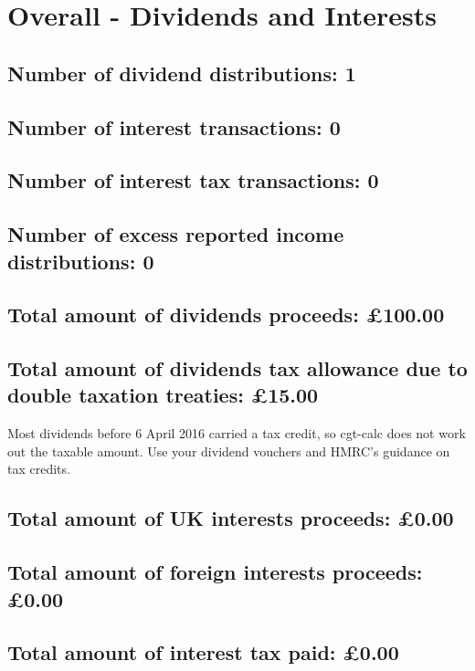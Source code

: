 \documentclass{article}
\begin{document}
\section*{Overall - Dividends and Interests}
\subsection*{Number of dividend distributions: 1}
\subsection*{Number of interest transactions: 0}
\subsection*{Number of interest tax transactions: 0}
\subsection*{Number of excess reported income distributions: 0}
\subsection*{Total amount of dividends proceeds: £100.00}
\subsection*{Total amount of dividends tax allowance due to double taxation treaties: £15.00}
Most dividends before 6 April 2016 carried a tax credit, so cgt-calc does not work out the taxable amount. Use your dividend vouchers and HMRC's guidance on tax credits.
\subsection*{Total amount of UK interests proceeds: £0.00}
\subsection*{Total amount of foreign interests proceeds: £0.00}
\subsection*{Total amount of interest tax paid: £0.00}
\end{document}
